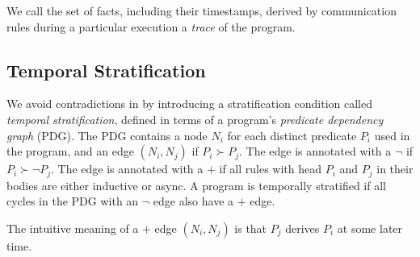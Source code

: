 We call the set of facts, including their timestamps, derived by communication
rules during a particular execution a {\em trace} of the program.

\subsection{Temporal Stratification}

We avoid contradictions in \lang by introducing a stratification condition called {\em
temporal stratification}, defined in terms of a program's {\em predicate
dependency graph} (PDG).  The PDG contains a node $N_i$ for each distinct
predicate $P_i$ used in the program, and an edge $(N_i, N_j)$ if $P_i \succ P_j$.
The edge is annotated with a
$\lnot$ if $P_i \succ \lnot P_j$.  The
edge is annotated with a $+$ if all rules with head $P_i$ and $P_j$ in their
bodies are either inductive or async.  A \lang program is temporally
stratified if all cycles in the PDG with an $\lnot$ edge also have a $+$
edge.

The intuitive meaning of a $+$ edge $(N_i, N_j)$ is that $P_j$ derives $P_i$ at
some later time.  


